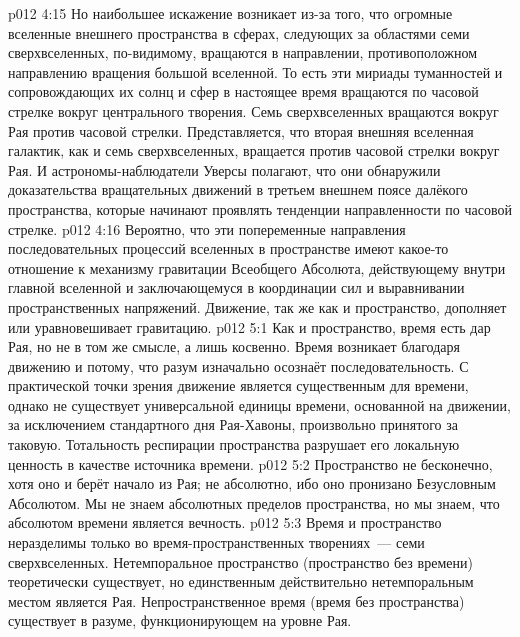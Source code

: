 \vs p012 4:15 Но наибольшее искажение возникает из-за того, что огромные вселенные внешнего пространства в сферах, следующих за областями семи сверхвселенных, по\hyp{}видимому, вращаются в направлении, противоположном направлению вращения большой вселенной. То есть эти мириады туманностей и сопровождающих их солнц и сфер в настоящее время вращаются по часовой стрелке вокруг центрального творения. Семь сверхвселенных вращаются вокруг Рая против часовой стрелки. Представляется, что вторая внешняя вселенная галактик, как и семь сверхвселенных, вращается против часовой стрелки вокруг Рая. И астрономы\hyp{}наблюдатели Уверсы полагают, что они обнаружили доказательства вращательных движений в третьем внешнем поясе далёкого пространства, которые начинают проявлять тенденции направленности по часовой стрелке.
\vs p012 4:16 Вероятно, что эти попеременные направления последовательных процессий вселенных в пространстве имеют какое\hyp{}то отношение к механизму гравитации Всеобщего Абсолюта, действующему внутри главной вселенной и заключающемуся в координации сил и выравнивании пространственных напряжений. Движение, так же как и пространство, дополняет или уравновешивает гравитацию.
\vs p012 5:1 Как и пространство, время есть дар Рая, но не в том же смысле, а лишь косвенно. Время возникает благодаря движению и потому, что разум изначально осознаёт последовательность. С практической точки зрения движение является существенным для времени, однако не существует универсальной единицы времени, основанной на движении, за исключением стандартного дня Рая\hyp{}Хавоны, произвольно принятого за таковую. Тотальность респирации пространства разрушает его локальную ценность в качестве источника времени.
\vs p012 5:2 Пространство не бесконечно, хотя оно и берёт начало из Рая; не абсолютно, ибо оно пронизано Безусловным Абсолютом. Мы не знаем абсолютных пределов пространства, но мы знаем, что абсолютом времени является вечность.
\vs p012 5:3 \pc Время и пространство неразделимы только во время\hyp{}пространственных творениях~--- семи сверхвселенных. Нетемпоральное пространство (пространство без времени) теоретически существует, но единственным действительно нетемпоральным местом является  Рая. Непространственное время (время без пространства) существует в разуме, функционирующем на уровне Рая.

